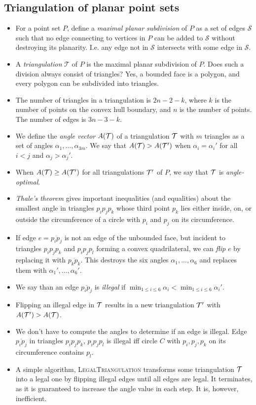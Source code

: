 \subsection{Triangulation of planar point sets}
\begin{itemize}
\item For a point set $P$, define a \emph{maximal planar subdivision}
  of $P$ as a set of edges $\mathcal{S}$ such that no edge connecting
  to vertices in $P$ can be added to $\mathcal{S}$ without destroying
  its planarity. I.e. any edge not in $\mathcal{S}$ intersects with
  some edge in $\mathcal{S}$.
\item A \emph{triangulation} $\mathcal{T}$ of $P$ is the maximal
  planar subdivision of $P$. Does such a division always consist of
  triangles? Yes, a bounded face is a polygon, and every polygon can
  be subdivided into triangles.
\item The number of triangles in a triangulation is $2n - 2 - k$,
  where $k$ is the number of points on the convex hull boundary, and
  $n$ is the number of points. The number of edges is $3n - 3 - k$.
\item We define the \emph{angle vector} $A(\mathcal{T})$ of a triangulation
  $\mathcal{T}$ with $m$ triangles as a set of angles $\alpha_1, ...,
  \alpha_{3m}$. We say that $A(\mathcal{T}) > A(\mathcal{T}')$ when $\alpha_i =
  \alpha_i'$ for all $i < j$ and $\alpha_j > \alpha_j'$.
\item When $A(\mathcal{T}) \geq A(\mathcal{T}')$ for all triangulations $\mathcal{T}'$ of $P$, we
  say that $\mathcal{T}$ is \emph{angle-optimal}.
\item \emph{Thale's theorem} gives important inequalities (and
  equalities) about the smallest angle in triangles $p_ip_jp_k$ whose
  third point $p_k$ lies either inside, on, or outside the
  circumference of a circle with $p_i$ and $p_j$ on its circumference.
\item If edge $e = \overline{p_ip_j}$ is not an edge of the unbounded
  face, but incident to triangles $p_ip_jp_k$ and $p_ip_jp_l$ forming
  a convex quadrilateral, we can \emph{flip} $e$ by replacing it with
  $\overline{p_kp_k}$. This destroys the six angles
  $\alpha_1,...,\alpha_6$ and replaces them with
  $\alpha_1',...,\alpha_6'$.
\item We say than an edge $\overline{p_ip_j}$ is \emph{illegal} if
  $\min_{1 \leq i \leq 6} \alpha_i < \min_{1 \leq i \leq 6}
  \alpha_i'$.
\item Flipping an illegal edge in $\mathcal{T}$ results in a new triangulation
  $\mathcal{T}'$ with $A(\mathcal{T}') > A(\mathcal{T})$.
\item We don't have to compute the angles to determine if an edge is
  illegal. Edge $\overline{p_ip_j}$ in triangles $p_ip_jp_k$,
  $p_ip_jp_l$ is illegal iff circle $C$ with $p_i,p_j,p_k$ on its
  circumference contains $p_l$.
\item A simple algorithm, \textsc{LegalTriangulation} transforms some
  triangulation $\mathcal{T}$ into a legal one by flipping illegal edges until
  all edges are legal. It terminates, as it is guaranteed to increase
  the angle value in each step. It is, however, inefficient.
\end{itemize}

